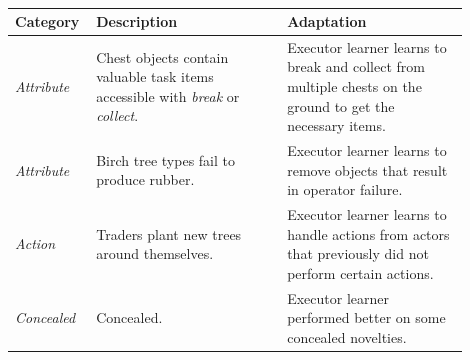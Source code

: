 \begin{table}[htbp]
    \centering
    \footnotesize
    \begin{tabular}{p{0.12\linewidth} p{0.4\linewidth} p{0.38\linewidth}}
    \toprule
    \textbf{Category} & \textbf{Description} & \textbf{Adaptation}\\
    \midrule
    \emph{Attribute} & Chest objects contain valuable task items accessible with \textit{break} or \textit{collect}. & Executor learner learns to break and collect from multiple chests on the ground to get the necessary items. \\
    \midrule
    \emph{Attribute} & Birch tree types fail to produce rubber. & Executor learner learns to remove objects that result in operator failure. \\
    \midrule
    \emph{Action} & Traders plant new trees around themselves. & Executor learner learns to handle actions from actors that previously did not perform certain actions. \\
    \midrule
    \emph{Concealed} & Concealed. & Executor learner performed better on some concealed novelties. \\
    \bottomrule
    \end{tabular}
    \caption{}
    \label{tab:ch5_rl_examples}
\end{table}
